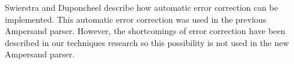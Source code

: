 Swierstra and Duponcheel  describe how automatic error correction can be implemented.
This automatic error correction was used in the previous Ampersand parser.
However, the shortcomings of error correction have been described in our techniques research \cite{parsing} so this possibility is not used in the new Ampersand parser.












